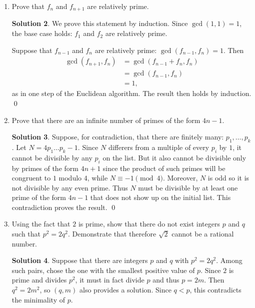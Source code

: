 \documentclass{article}
\theoremstyle{definition}
\newtheorem*{solution}{Solution}
\begin{document}
\begin{enumerate}
\begin{solution}
\begin{align*}
15 &= 1 \cdot 12 + 3 \\
12 &= 4 \cdot 3,
\end{align*}
so the greatest common divisor is $3$.  Now
\begin{align*}
3 &= 15 - 12 \\
&= 15 - (27-15) \\
&= 2 \cdot 15 - 27 \\
&= 2 \cdot (69-2 \cdot 27) - 27 \\
&= 2 \cdot 69 - 5 \cdot 27 \\
&= 2 \cdot 69 - 5 \cdot (165 - 2 \cdot 69) \\
&= 12 \cdot 69 - 5 \cdot 165 \\
&= 12 \cdot (234 - 165) - 5 \cdot 165 \\
&= 12 \cdot 234 - 17 \cdot 165,
\end{align*}
so we may take $r = 12$ and $s = -17$.
\end{solution}
\item[2.17(e).] Prove that $f_n$ and $f_{n+1}$ are relatively prime.
\begin{solution}
We prove this statement by induction.  Since $\gcd(1,1) = 1$, the base case holds: $f_1$ and $f_2$ are relatively prime.

Suppose that $f_{n-1}$ and $f_n$ are relatively prime: $\gcd(f_{n-1},f_n) = 1$.  Then
\begin{align*}
\gcd(f_{n+1}, f_n) &= \gcd(f_{n-1} + f_n, f_n) \\
&= \gcd(f_{n-1}, f_n) \\
&= 1,
\end{align*}
as in one step of the Euclidean algorithm.  The result then holds by induction. \qed
\end{solution}
\item[2.30.] Prove that there are an infinite number of primes of the form $4n-1$.
\begin{solution}
Suppose, for contradiction, that there are finitely many: $p_1, \dots, p_k$.  Let $N = 4p_1\dots p_k - 1$.  Since $N$ differers from a multiple of every $p_i$ by $1$, it cannot be divisible by any $p_i$ on the list.  But it also cannot be divisible only by primes of the form $4n+1$ since the product of such primes will be congruent to $1$ modulo $4$, while $N \equiv -1 \pmod{4}$.  Moreover, $N$ is odd so it is not divisible by any even prime.  Thus $N$ must be divisible by at least one prime of the form $4n-1$ that does not show up on the initial list.  This contradiction proves the result. \qed
\end{solution}
\item[2.31.] Using the fact that $2$ is prime, show that there do not exist integers $p$ and $q$ such that $p^2 = 2q^2$.  Demonstrate that therefore $\sqrt{2}$ cannot be a rational number.
\begin{solution}
Suppose that there are integers $p$ and $q$ with $p^2 = 2q^2$.  Among such pairs, chose the one with the smallest positive value of $p$.  Since $2$ is prime and divides $p^2$, it must in fact divide $p$ and thus $p = 2m$.  Then $q^2 = 2m^2$, so $(q, m)$ also provides a solution.  Since $q < p$, this contradicts the minimality of $p$.


\end{solution}
\end{enumerate}
\end{document}
